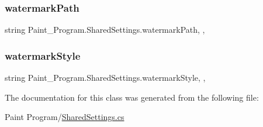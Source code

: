 \subsubsection{\texorpdfstring{watermark\+Path}{watermarkPath}}
{\footnotesize\ttfamily string Paint\+\_\+\+Program.\+Shared\+Settings.\+watermark\+Path\hspace{0.3cm}{\ttfamily [static]}, {\ttfamily [get]}, {\ttfamily [set]}}

\mbox{\label{class_paint___program_1_1_shared_settings_ae702314f87ebe8e4da32b2bf2f4f1634}} 
\subsubsection{\texorpdfstring{watermark\+Style}{watermarkStyle}}
{\footnotesize\ttfamily string Paint\+\_\+\+Program.\+Shared\+Settings.\+watermark\+Style\hspace{0.3cm}{\ttfamily [static]}, {\ttfamily [get]}, {\ttfamily [set]}}



The documentation for this class was generated from the following file\+:\begin{DoxyCompactItemize}
\item 
Paint Program/\mbox{\hyperlink{_shared_settings_8cs}{Shared\+Settings.\+cs}}\end{DoxyCompactItemize}
